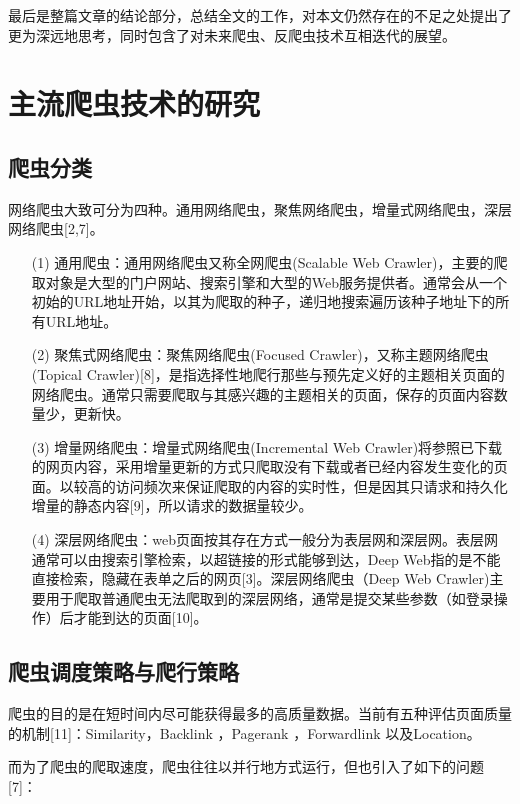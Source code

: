 \documentclass[doctor,privacy,twoside]{buaa_mac}
\begin{document}
最后是整篇文章的结论部分，总结全文的工作，对本文仍然存在的不足之处提出了更为深远地思考，同时包含了对未来爬虫、反爬虫技术互相迭代的展望。






\chapter{主流爬虫技术的研究}

\section{爬虫分类}
网络爬虫大致可分为四种。通用网络爬虫，聚焦网络爬虫，增量式网络爬虫，深层网络爬虫[2,7]。

\begin{itemize}
\item[(1)] 通用爬虫：通用网络爬虫又称全网爬虫(Scalable Web Crawler)，主要的爬取对象是大型的门户网站、搜索引擎和大型的Web服务提供者。通常会从一个初始的URL地址开始，以其为爬取的种子，递归地搜索遍历该种子地址下的所有URL地址。
\item[(2)] 聚焦式网络爬虫：聚焦网络爬虫(Focused Crawler)，又称主题网络爬虫(Topical Crawler)[8]，是指选择性地爬行那些与预先定义好的主题相关页面的网络爬虫。通常只需要爬取与其感兴趣的主题相关的页面，保存的页面内容数量少，更新快。
\item[(3)] 增量网络爬虫：增量式网络爬虫(Incremental Web Crawler)将参照已下载的网页内容，采用增量更新的方式只爬取没有下载或者已经内容发生变化的页面。以较高的访问频次来保证爬取的内容的实时性，但是因其只请求和持久化增量的静态内容[9]，所以请求的数据量较少。
\item[(4)] 深层网络爬虫：web页面按其存在方式一般分为表层网和深层网。表层网通常可以由搜索引擎检索，以超链接的形式能够到达，Deep Web指的是不能直接检索，隐藏在表单之后的网页[3]。深层网络爬虫（Deep Web Crawler)主要用于爬取普通爬虫无法爬取到的深层网络，通常是提交某些参数（如登录操作）后才能到达的页面[10]。
\end{itemize}




\section{爬虫调度策略与爬行策略}
爬虫的目的是在短时间内尽可能获得最多的高质量数据。当前有五种评估页面质量的机制[11]：Similarity，Backlink ，Pagerank ，Forwardlink 以及Location。

而为了爬虫的爬取速度，爬虫往往以并行地方式运行，但也引入了如下的问题[7]：
\end{document}
